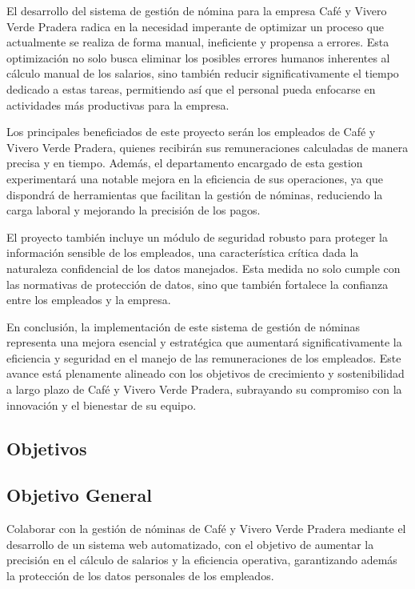 El desarrollo del sistema de gestión de nómina para la empresa Café y
Vivero Verde Pradera radica en la necesidad imperante de optimizar un
proceso que actualmente se realiza de forma manual, ineficiente y
propensa a errores. Esta optimización no solo busca eliminar los posibles
errores humanos inherentes al cálculo manual de los salarios,
sino también reducir significativamente el tiempo dedicado a estas tareas,
permitiendo así que el personal pueda enfocarse en actividades más productivas
para la empresa.

Los principales beneficiados de este proyecto serán los empleados de Café y
Vivero Verde Pradera, quienes recibirán sus remuneraciones calculadas de
manera precisa y en tiempo. Además, el departamento encargado de esta gestion
experimentará una notable mejora en la eficiencia de sus operaciones,
ya que dispondrá de herramientas que facilitan la gestión de nóminas,
reduciendo la carga laboral y mejorando la precisión de los pagos.

El proyecto también incluye un módulo de seguridad robusto para proteger la
información sensible de los empleados, una característica crítica dada la
naturaleza confidencial de los datos manejados. Esta medida no solo cumple
con las normativas de protección de datos, sino que también fortalece la
confianza entre los empleados y la empresa.

En conclusión, la implementación de este sistema de gestión de nóminas
representa una mejora esencial y estratégica que aumentará significativamente
la eficiencia y seguridad en el manejo de las remuneraciones de los empleados.
Este avance está plenamente alineado con los objetivos de crecimiento y
sostenibilidad a largo plazo de Café y Vivero Verde Pradera, subrayando su
compromiso con la innovación y el bienestar de su equipo.

\subsection{Objetivos}

\subsection{Objetivo General}
Colaborar con la gestión de nóminas de Café y Vivero Verde Pradera mediante el
desarrollo de un sistema web automatizado, con el objetivo de aumentar la precisión
en el cálculo de salarios y la eficiencia operativa, garantizando además la protección de
los datos personales de los empleados.

